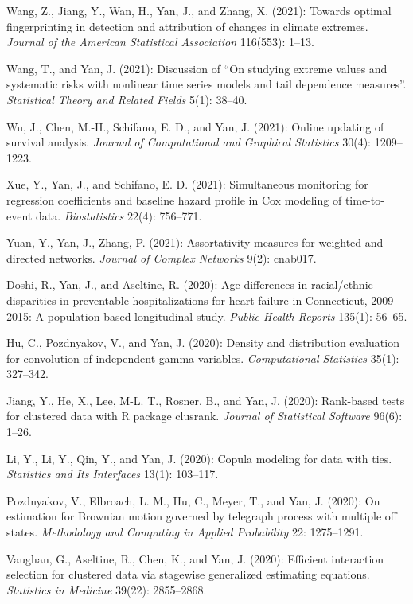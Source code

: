\documentclass[Statistics]{vita}
\begin{document}
\begin{vita}
\begin{Publications}
\begin{RefereedJournalArticles}
  \item *Wang, Z., Jiang, Y., Wan, H., Yan, J., and Zhang, X. (2021): Towards optimal fingerprinting in detection and attribution of changes in climate extremes. {\em Journal of the American Statistical Association\/} 116(553): 1--13.
  \item Wang, T., and Yan, J. (2021): Discussion of ``On studying extreme values and systematic risks with nonlinear time series models and tail dependence measures''. {\em Statistical Theory and Related Fields\/} 5(1): 38--40.
  \item *Wu, J., Chen, M.-H., Schifano, E. D., and Yan, J. (2021): Online updating of survival analysis. {\em Journal of Computational and Graphical Statistics\/} 30(4): 1209--1223.
  \item *Xue, Y., Yan, J., and Schifano, E. D. (2021): Simultaneous monitoring for regression coefficients and baseline hazard profile in Cox modeling of time-to-event data. {\em Biostatistics\/} 22(4): 756--771.
  \item *Yuan, Y., Yan, J., Zhang, P. (2021): Assortativity measures for weighted and directed networks. {\em Journal of Complex Networks\/} 9(2): cnab017. 
  \item *Doshi, R., Yan, J., and Aseltine, R. (2020): Age differences in racial/ethnic disparities in preventable hospitalizations for heart failure in Connecticut, 2009-2015: A population-based longitudinal study. {\em Public Health Reports\/} 135(1): 56--65.
  \item *Hu, C., Pozdnyakov, V., and Yan, J. (2020): Density and distribution evaluation for convolution of independent gamma variables. {\em Computational Statistics\/} 35(1): 327--342.
  \item *Jiang, Y., He, X., Lee, M-L. T., Rosner, B., and Yan, J. (2020): Rank-based tests for clustered data with R package clusrank. {\em Journal of Statistical Software\/} 96(6): 1--26.
  \item *Li, Y., Li, Y., Qin, Y., and Yan, J. (2020): Copula modeling for data with ties.  {\em Statistics and Its Interfaces\/} 13(1): 103--117.
  \item Pozdnyakov, V., Elbroach, L. M., Hu, C., Meyer, T., and Yan, J. (2020): On estimation for Brownian motion governed by telegraph process with multiple off states. {\em Methodology and Computing in Applied Probability\/} 22: 1275--1291.
  \item *Vaughan, G., Aseltine, R., Chen, K., and Yan, J. (2020): Efficient interaction selection for clustered data via stagewise generalized estimating equations. {\em Statistics in Medicine\/} 39(22): 2855--2868.

\end{RefereedJournalArticles}
\end{Publications}
\end{vita}
\end{document}
